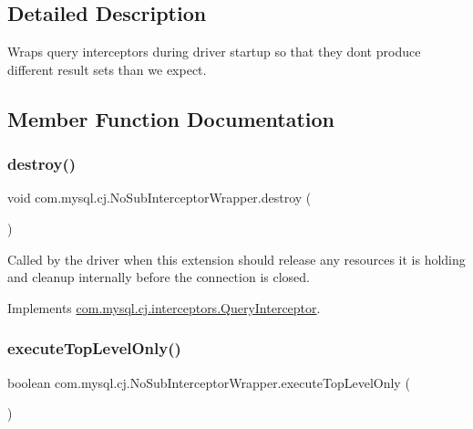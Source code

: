 \subsection{Detailed Description}
Wraps query interceptors during driver startup so that they don\textquotesingle{}t produce different result sets than we expect. 

\subsection{Member Function Documentation}
\mbox{\label{classcom_1_1mysql_1_1cj_1_1_no_sub_interceptor_wrapper_a196b252abd96fbdd70d0dd6f844145b8}} 
\subsubsection{\texorpdfstring{destroy()}{destroy()}}
{\footnotesize\ttfamily void com.\+mysql.\+cj.\+No\+Sub\+Interceptor\+Wrapper.\+destroy (\begin{DoxyParamCaption}{ }\end{DoxyParamCaption})}

Called by the driver when this extension should release any resources it is holding and cleanup internally before the connection is closed. 

Implements \mbox{\hyperlink{interfacecom_1_1mysql_1_1cj_1_1interceptors_1_1_query_interceptor_a123809a91800f4f4409f5f37717bf9c8}{com.\+mysql.\+cj.\+interceptors.\+Query\+Interceptor}}.

\mbox{\label{classcom_1_1mysql_1_1cj_1_1_no_sub_interceptor_wrapper_a84d3030e0055b60ed0bb2b56fd5a0dbe}} 
\subsubsection{\texorpdfstring{execute\+Top\+Level\+Only()}{executeTopLevelOnly()}}
{\footnotesize\ttfamily boolean com.\+mysql.\+cj.\+No\+Sub\+Interceptor\+Wrapper.\+execute\+Top\+Level\+Only (\begin{DoxyParamCaption}{ }\end{DoxyParamCaption})}

